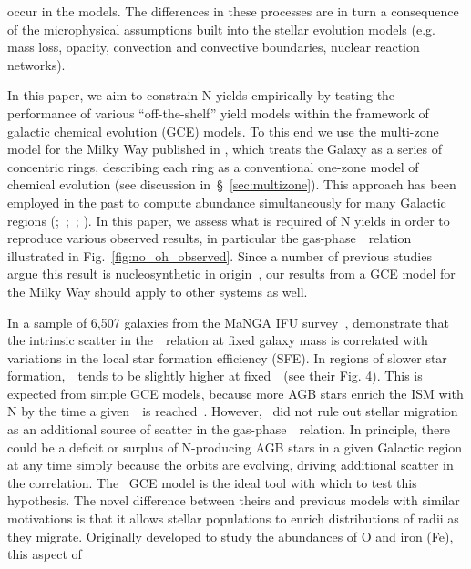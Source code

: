 \documentclass[ms.tex]{subfiles}
\begin{document}
occur in the models.
The differences in these processes are in turn a consequence of the
microphysical assumptions built into the stellar evolution models (e.g. mass
loss, opacity, convection and convective boundaries, nuclear reaction networks).
\par
In this paper, we aim to constrain N yields empirically by testing the
performance of various ``off-the-shelf'' yield models within the framework of
galactic chemical evolution (GCE) models.
To this end we use the multi-zone model for the Milky Way published in
\citet{Johnson2021}, which treats the Galaxy as a series of concentric rings,
describing each ring as a conventional one-zone model of chemical evolution
(see discussion in~\S~\ref{sec:multizone}).
This approach has been employed in the past to compute abundance simultaneously
for many Galactic regions (\citealp{Matteucci1989, Wyse1989, Prantzos1995,
Schoenrich2009};~\citealp*{Minchev2013, Minchev2014};~\citealp{Minchev2017};
\citealp*{Sharma2021}).
In this paper, we assess what is required of N yields in order to reproduce
various observed results, in particular the gas-phase~\ohno~relation
illustrated in Fig.~\ref{fig:no_oh_observed}.
Since a number of previous studies argue this result is nucleosynthetic in
origin~\citep[e.g.][]{Pilyugin2012, Andrews2013}, our results from a GCE model
for the Milky Way should apply to other systems as well.
\par
In a sample of 6,507 galaxies from the MaNGA IFU survey~\citep{Bundy2015},
\citet{Schaefer2020} demonstrate that the intrinsic scatter in
the~\ohno~relation at fixed galaxy mass is correlated with variations in the
local star formation efficiency (SFE).
In regions of slower star formation,~\no~tends to be slightly higher at
fixed~\oh~(see their Fig. 4).
This is expected from simple GCE models, because more AGB stars enrich the
ISM with N by the time a given~\oh~is reached~\citep[e.g.][]{Molla2006,
Vincenzo2016a}.
However,~\citet{Schaefer2020} did not rule out stellar migration as an
additional source of scatter in the gas-phase~\ohno~relation.
In principle, there could be a deficit or surplus of N-producing AGB stars in a
given Galactic region at any time simply because the orbits are evolving,
driving additional scatter in the correlation.
The~\citet{Johnson2021} GCE model is the ideal tool with which to test this
hypothesis.
The novel difference between theirs and previous models with similar
motivations is that it allows stellar populations to enrich distributions of
radii as they migrate.
Originally developed to study the abundances of O and iron (Fe), this aspect of
\end{document}
